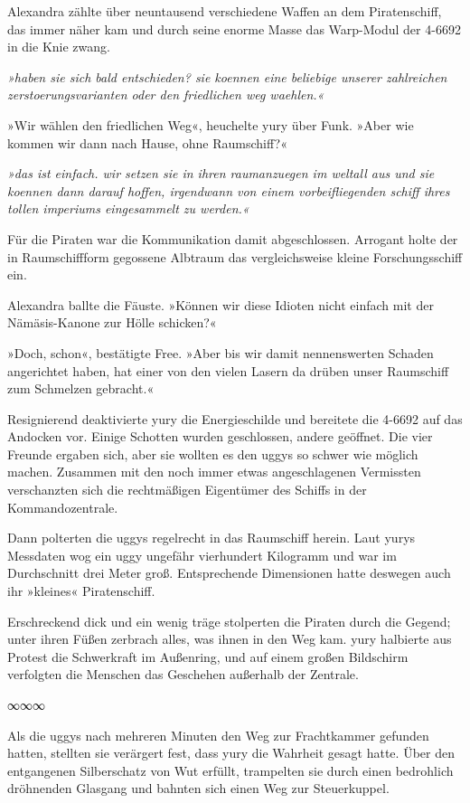 Alexandra zählte über neuntausend verschiedene Waffen an dem Piratenschiff, das immer näher kam und durch seine enorme Masse das Warp-Modul der 4-6692 in die Knie zwang.

\textit{»haben sie sich bald entschieden? sie koennen eine beliebige unserer zahlreichen zerstoerungsvarianten oder den friedlichen weg waehlen.«}

»Wir wählen den friedlichen Weg«, heuchelte yury über Funk. »Aber wie kommen wir dann nach Hause, ohne Raumschiff?«

\textit{»das ist einfach. wir setzen sie in ihren raumanzuegen im weltall aus und sie koennen dann darauf hoffen, irgendwann von einem vorbeifliegenden schiff ihres tollen imperiums eingesammelt zu werden.«}

Für die Piraten war die Kommunikation damit abgeschlossen. Arrogant holte der in Raumschiffform gegossene Albtraum das vergleichsweise kleine Forschungsschiff ein.

Alexandra ballte die Fäuste. »Können wir diese Idioten nicht einfach mit der Nämäsis-Kanone zur Hölle schicken?«

»Doch, schon«, bestätigte Free. »Aber bis wir damit nennenswerten Schaden angerichtet haben, hat einer von den vielen Lasern da drüben unser Raumschiff zum Schmelzen gebracht.«

Resignierend deaktivierte yury die Energieschilde und bereitete die 4-6692 auf das Andocken vor. Einige Schotten wurden geschlossen, andere geöffnet. Die vier Freunde ergaben sich, aber sie wollten es den uggys so schwer wie möglich machen. Zusammen mit den noch immer etwas angeschlagenen Vermissten verschanzten sich die rechtmäßigen Eigentümer des Schiffs in der Kommandozentrale.

Dann polterten die uggys regelrecht in das Raumschiff herein. Laut yurys Messdaten wog ein uggy ungefähr vierhundert Kilogramm und war im Durchschnitt drei Meter groß. Entsprechende Dimensionen hatte deswegen auch ihr »kleines« Piratenschiff.

Erschreckend dick und ein wenig träge stolperten die Piraten durch die Gegend; unter ihren Füßen zerbrach alles, was ihnen in den Weg kam. yury halbierte aus Protest die Schwerkraft im Außenring, und auf einem großen Bildschirm verfolgten die Menschen das Geschehen außerhalb der Zentrale.

\begin{center}
    ∞∞∞
\end{center}

Als die uggys nach mehreren Minuten den Weg zur Frachtkammer gefunden hatten, stellten sie verärgert fest, dass yury die Wahrheit gesagt hatte. Über den entgangenen Silberschatz von Wut erfüllt, trampelten sie durch einen bedrohlich dröhnenden Glasgang und bahnten sich einen Weg zur Steuerkuppel.

